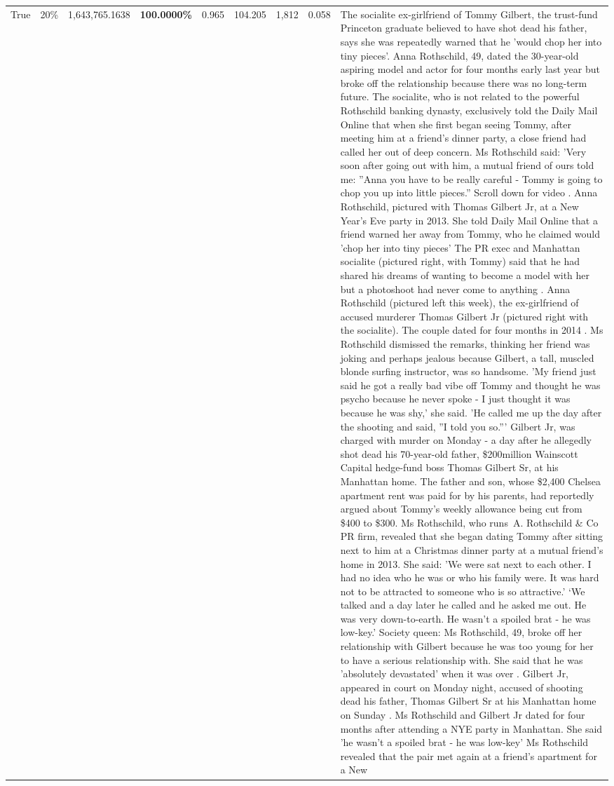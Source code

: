 \begin{table}[H]
\begin{tabular}{lllrlllll}
True & 20\% & 1,643,765.1638 & \bfseries \color{red} 100.0000\% & 0.965 & 104.205 & 1,812 & 0.058 & The socialite ex-girlfriend of Tommy Gilbert, the trust-fund Princeton graduate believed to have shot dead his father, says she was repeatedly warned that he 'would chop her into tiny pieces'. Anna Rothschild, 49, dated the 30-year-old aspiring model and actor for four months early last year but broke off the relationship because there was no long-term future. The socialite, who is not related to the powerful Rothschild banking dynasty, exclusively told the Daily Mail Online that when she first began seeing Tommy, after meeting him at a friend's dinner party, a close friend had called her out of deep concern. Ms Rothschild said: 'Very soon after going out with him, a mutual friend of ours told me: ''Anna you have to be really careful - Tommy is going to chop you up into little pieces.'' Scroll down for video . Anna Rothschild, pictured with Thomas Gilbert Jr, at a New Year's Eve party in 2013. She told Daily Mail Online that a friend warned her away from Tommy, who he claimed would 'chop her into tiny pieces' The PR exec and Manhattan socialite (pictured right, with Tommy) said that he had shared his dreams of wanting to become a model with her but a photoshoot had never come to anything . Anna Rothschild (pictured left this week), the ex-girlfriend of accused murderer Thomas Gilbert Jr (pictured right with the socialite). The couple dated for four months in 2014 . Ms Rothschild dismissed the remarks, thinking her friend was joking and perhaps jealous because Gilbert, a tall, muscled blonde surfing instructor, was so handsome. 'My friend just said he got a really bad vibe off Tommy and thought he was psycho because he never spoke - I just thought it was because he was shy,' she said. 'He called me up the day after the shooting and said, ''I told you so.''' Gilbert Jr, was charged with murder on Monday - a day after he allegedly shot dead his 70-year-old father, \$200million Wainscott Capital hedge-fund boss Thomas Gilbert Sr, at his Manhattan home. The father and son, whose \$2,400 Chelsea apartment rent was paid for by his parents, had reportedly argued about Tommy's weekly allowance being cut from \$400 to \$300. Ms Rothschild, who runs A. Rothschild \& Co PR firm, revealed that she began dating Tommy after sitting next to him at a Christmas dinner party at a mutual friend's home in 2013. She said: 'We were sat next to each other. I had no idea who he was or who his family were. It was hard not to be attracted to someone who is so attractive.' ‘We talked and a day later he called and he asked me out. He was very down-to-earth. He wasn’t a spoiled brat - he was low-key.’ Society queen: Ms Rothschild, 49, broke off her relationship with Gilbert because he was too young for her to have a serious relationship with. She said that he was 'absolutely devastated' when it was over . Gilbert Jr, appeared in court on Monday night, accused of shooting dead his father, Thomas Gilbert Sr at his Manhattan home on Sunday . Ms Rothschild and Gilbert Jr dated for four months after attending a NYE party in Manhattan. She said 'he wasn't a spoiled brat - he was low-key' Ms Rothschild revealed that the pair met again at a friend’s apartment for a New 
\end{tabular}
\end{table}
